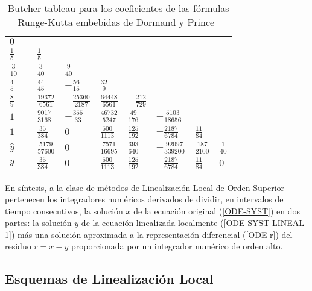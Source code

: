 \begin{table}[h]
	\caption{Butcher tableau para los coeficientes de las fórmulas Runge-Kutta embebidas de Dormand y Prince~\cite{hairer1993solving}} \label{ButcherTabla}
	\begin{center}
		\begin{tabular}{ l@{\vrule height 5pt depth 10pt width 0pt}|lllllll}
			$0$ & \\
			$\frac{1}{5}\quad$ & $\frac{1}{5}$ \\
			$\frac{3}{10}\quad$ & $\frac{3}{40}$ & $\frac{9}{40}$ \\
			$\frac{4}{5}\quad$ & $\frac{44}{45}$ & $-\frac{56}{15}$ & $\frac{32}{9}$ \\
			$\frac{8}{9}\quad$ & $\frac{19372}{6561}$ & $-\frac{25360}{2187}$ & $\frac{64448}{6561}$ & $-\frac{212}{729}$ \\
			$1\quad$ & $\frac{9017}{3168}$ & $-\frac{355}{33}$ & $\frac{46732}{5247}$ & $\frac{49}{176}$
			& $-\frac{5103}{18656}$ \\
			$1\quad$ & $\frac{35}{384}$ & $0$ & $\frac{500}{1113}$ & $\frac{125}{192}$
			& $-\frac{2187}{6784}$ & $\frac{11}{84}$ \\
			\hline
			$\widehat{y}$ & $\frac{5179}{57600}$ & $0$ & $\frac{7571}{16695}$ & $\frac{393}{640}$
			& $-\frac{92097}{339200}$ & $\frac{187}{2100}$ & $\frac{1}{40}$
			\rule[-0.3cm]{0cm}{0.8cm} \\
			$y$ & $\frac{35}{384}$ & $0$ & $\frac{500}{1113}$ & $\frac{125}{192}$
			& $-\frac{2187}{6784}$ & $\frac{11}{84}$ & $0$
		\end{tabular}
	\end{center}
\end{table}

En síntesis, a la clase de métodos de Linealización Local de Orden Superior pertenecen los integradores numéricos derivados de dividir, en intervalos de tiempo consecutivos, la solución $x$ de la ecuación original (\ref{ODE-SYST}) en dos partes: la solución $y$ de la ecuación linealizada localmente 
(\ref{ODE-SYST-LINEAL-1}) más una solución aproximada a la representación diferencial (\ref{ODE r}) del residuo $r = x-y$ proporcionada por un integrador numérico de orden alto.


\subsection{Esquemas de Linealización Local}

